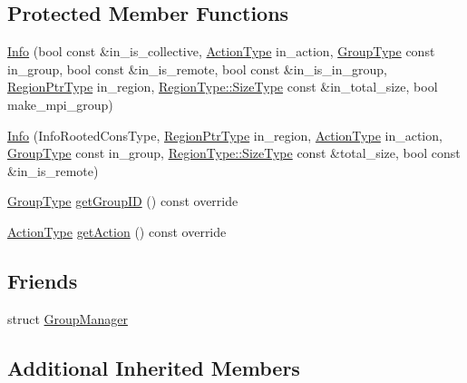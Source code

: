 \subsection*{Protected Member Functions}
\begin{DoxyCompactItemize}
\item 
\hyperlink{structvt_1_1group_1_1_info_ae037ba873e2888a5783ac87eb5f7a33c}{Info} (bool const \&in\+\_\+is\+\_\+collective, \hyperlink{namespacevt_ae0a5a7b18cc99d7b732cb4d44f46b0f3}{Action\+Type} in\+\_\+action, \hyperlink{namespacevt_a27b5e4411c9b6140c49100e050e2f743}{Group\+Type} const in\+\_\+group, bool const \&in\+\_\+is\+\_\+remote, bool const \&in\+\_\+is\+\_\+in\+\_\+group, \hyperlink{structvt_1_1group_1_1_info_rooted_a127ac5ebcfb9871621c1f66dba481c0b}{Region\+Ptr\+Type} in\+\_\+region, \hyperlink{structvt_1_1group_1_1region_1_1_region_a9bb381adf31111aae34dbc644bad6c1f}{Region\+Type\+::\+Size\+Type} const \&in\+\_\+total\+\_\+size, bool make\+\_\+mpi\+\_\+group)
\item 
\hyperlink{structvt_1_1group_1_1_info_a246c74e5238c8fc15d49c258bd25afd5}{Info} (Info\+Rooted\+Cons\+Type, \hyperlink{structvt_1_1group_1_1_info_rooted_a127ac5ebcfb9871621c1f66dba481c0b}{Region\+Ptr\+Type} in\+\_\+region, \hyperlink{namespacevt_ae0a5a7b18cc99d7b732cb4d44f46b0f3}{Action\+Type} in\+\_\+action, \hyperlink{namespacevt_a27b5e4411c9b6140c49100e050e2f743}{Group\+Type} const in\+\_\+group, \hyperlink{structvt_1_1group_1_1region_1_1_region_a9bb381adf31111aae34dbc644bad6c1f}{Region\+Type\+::\+Size\+Type} const \&total\+\_\+size, bool const \&in\+\_\+is\+\_\+remote)
\item 
\hyperlink{namespacevt_a27b5e4411c9b6140c49100e050e2f743}{Group\+Type} \hyperlink{structvt_1_1group_1_1_info_a09fcb16e74a5ae3043859ae70b5b57a9}{get\+Group\+ID} () const override
\item 
\hyperlink{namespacevt_ae0a5a7b18cc99d7b732cb4d44f46b0f3}{Action\+Type} \hyperlink{structvt_1_1group_1_1_info_a399b8266c01f53484469b3b14cdc8640}{get\+Action} () const override
\end{DoxyCompactItemize}
\subsection*{Friends}
\begin{DoxyCompactItemize}
\item 
struct \hyperlink{structvt_1_1group_1_1_info_a698f77439e02c4d3309fed882290c09c}{Group\+Manager}
\end{DoxyCompactItemize}
\subsection*{Additional Inherited Members}


